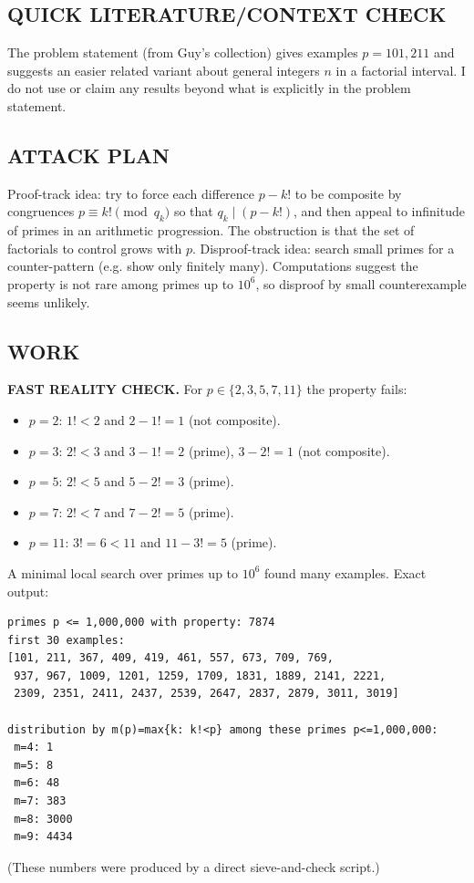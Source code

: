 \subsection*{QUICK LITERATURE/CONTEXT CHECK}
The problem statement (from Guy's collection) gives examples $p=101,211$ and suggests an easier related variant about general integers $n$ in a factorial interval. I do not use or claim any results beyond what is explicitly in the problem statement.

\subsection*{ATTACK PLAN}
Proof-track idea: try to force each difference $p-k!$ to be composite by congruences $p\equiv k!\pmod{q_k}$ so that $q_k\mid (p-k!)$, and then appeal to infinitude of primes in an arithmetic progression. The obstruction is that the set of factorials to control grows with $p$.
Disproof-track idea: search small primes for a counter-pattern (e.g. show only finitely many). Computations suggest the property is not rare among primes up to $10^6$, so disproof by small counterexample seems unlikely.

\subsection*{WORK}
\textbf{FAST REALITY CHECK.}
For $p\in\{2,3,5,7,11\}$ the property fails:
\begin{itemize}
\item $p=2$: $1!<2$ and $2-1!=1$ (not composite).
\item $p=3$: $2!<3$ and $3-1!=2$ (prime), $3-2!=1$ (not composite).
\item $p=5$: $2!<5$ and $5-2!=3$ (prime).
\item $p=7$: $2!<7$ and $7-2!=5$ (prime).
\item $p=11$: $3!=6<11$ and $11-3!=5$ (prime).
\end{itemize}
A minimal local search over primes up to $10^6$ found many examples. Exact output:
\begin{verbatim}
primes p <= 1,000,000 with property: 7874
first 30 examples:
[101, 211, 367, 409, 419, 461, 557, 673, 709, 769,
 937, 967, 1009, 1201, 1259, 1709, 1831, 1889, 2141, 2221,
 2309, 2351, 2411, 2437, 2539, 2647, 2837, 2879, 3011, 3019]

distribution by m(p)=max{k: k!<p} among these primes p<=1,000,000:
 m=4: 1
 m=5: 8
 m=6: 48
 m=7: 383
 m=8: 3000
 m=9: 4434
\end{verbatim}
(These numbers were produced by a direct sieve-and-check script.)

